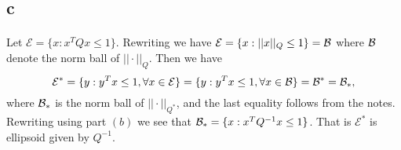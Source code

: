 \documentclass[letterpaper,12pt,oneside,onecolumn]{article}
\newcommand{\cE}{\mathcal{E}} \newcommand{\cF}{\mathcal{F}}
\begin{document}
\subsection{c}
\paragraph{}
Let $\cE = \{x : x^TQx \leq 1\}.$  Rewriting we have $\cE = \{x : ||x||_Q \leq 1\} = \cB$ where $\mathcal{B}$ denote the norm ball of $||\cdot||_Q$. Then we have
$$\cE^* = \{y : y^Tx \leq 1, \forall x \in \cE\} = \{y : y^Tx \leq 1, \forall x \in \cB\}  = \cB^* = \cB_*,$$
where $\mathcal{B}_*$ is the norm ball of $||\cdot||_{Q^*}$, and the last equality follows from the notes. Rewriting using part $(b)$ we see that $\mathcal{B}_* = \{x: x^TQ^{-1}x \leq 1\}$. That is $\cE^*$ is ellipsoid given by $Q^{-1}$.
\end{document}
